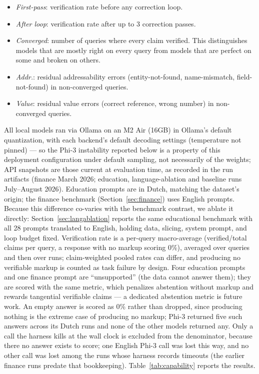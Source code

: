 \documentclass[11pt,a4paper]{article}
\begin{document}
\begin{itemize}[nosep]
    \item \textit{First-pass}: verification rate before any correction loop.
    \item \textit{After loop}: verification rate after up to 3 correction passes.
    \item \textit{Converged}: number of queries where every claim verified. This distinguishes models that are mostly right on every query from models that are perfect on some and broken on others.
    \item \textit{Addr.}: residual addressability errors (entity-not-found, name-mismatch, field-not-found) in non-converged queries.
    \item \textit{Value}: residual value errors (correct reference, wrong number) in non-converged queries.
\end{itemize}

\noindent All local models ran via Ollama on an M2 Air (16GB) in Ollama's default quantization, with each backend's default decoding settings (temperature not pinned) --- so the Phi-3 instability reported below is a property of this deployment configuration under default sampling, not necessarily of the weights; API snapshots are those current at evaluation time, as recorded in the run artifacts (finance March 2026; education, language-ablation and baseline runs July--August 2026). Education prompts are in Dutch, matching the dataset's origin; the finance benchmark (Section~\ref{sec:finance}) uses English prompts. Because this difference co-varies with the benchmark contrast, we ablate it directly: Section~\ref{sec:langablation} reports the same educational benchmark with all 28 prompts translated to English, holding data, slicing, system prompt, and loop budget fixed. Verification rate is a per-query macro-average (verified/total claims per query, a response with no markup scoring 0\%), averaged over queries and then over runs; claim-weighted pooled rates can differ, and producing no verifiable markup is counted as task failure by design. Four education prompts and one finance prompt are ``unsupported'' (the data cannot answer them); they are scored with the same metric, which penalizes abstention without markup and rewards tangential verifiable claims --- a dedicated abstention metric is future work. An empty answer is scored as 0\% rather than dropped, since producing nothing is the extreme case of producing no markup; Phi-3 returned five such answers across its Dutch runs and none of the other models returned any. Only a call the harness kills at the wall clock is excluded from the denominator, because there no answer exists to score; one English Phi-3 call was lost this way, and no other call was lost among the runs whose harness records timeouts (the earlier finance runs predate that bookkeeping). Table~\ref{tab:capability} reports the results.
\end{document}
